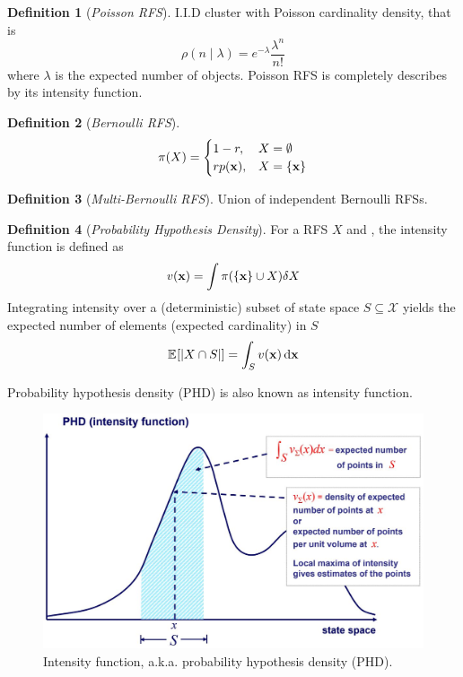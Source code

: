 \documentclass[a4paper,10pt]{scrreprt}
\theoremstyle{theorem}
\theoremstyle{definition}
\newtheorem{defn}{Definition}
\begin{document}
\begin{defn}[\emph{Poisson RFS}]
	I.I.D cluster with Poisson cardinality density, that is
	\begin{equation}\label{key}
		\rho(n \mid \lambda) = e^{-\lambda} \frac{\lambda^n}{n!}
	\end{equation}
	where \( \lambda \) is the expected number of objects.
	Poisson RFS is completely describes by its intensity function.
\end{defn}

\begin{defn}[\emph{Bernoulli RFS}]
\begin{equation}\label{eq:bernoulli_rfs}
	\pi(X) = 
	\begin{cases}
	1 - r, 			& X = \emptyset \\
	r p(\stVar), 	& X = \Bqty{\stVar}
	\end{cases}
\end{equation}
\end{defn}

\begin{defn}[\emph{Multi-Bernoulli RFS}]
	Union of independent Bernoulli RFSs.
\end{defn}

\begin{defn}[\emph{Probability Hypothesis Density}]
	For a RFS \( X \) and , the intensity function is defined as
	\begin{equation}\label{key}
		v(\stVar) = \int \pi(\Bqty{\stVar} \cup X) \dsx[X]
	\end{equation}
	Integrating intensity over a (deterministic) subset of state space \( S \subseteq \mathcal{X} \) yields the expected number of elements (expected cardinality) in \( S \)
	\begin{equation}\label{key}
		\E{|X \cap S|} = \int_S v(\stVar) \dx[\stVar]
	\end{equation}
\end{defn}
Probability hypothesis density (PHD) is also known as intensity function.

\begin{figure}[h]
	\centering
	\includegraphics[scale=0.22]{./img/intensity_function}
	\caption{Intensity function, a.k.a. probability hypothesis density (PHD).}
\end{figure}
\end{document}
